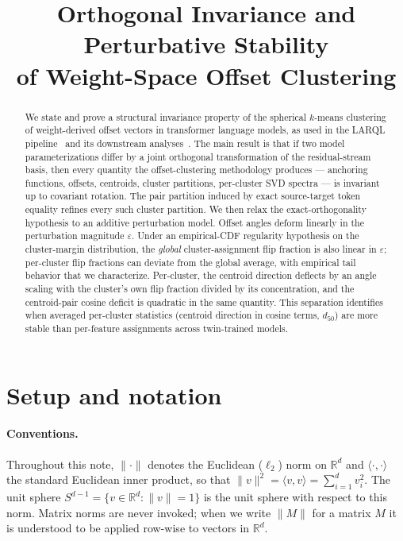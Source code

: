 \documentclass[11pt,letterpaper]{article}
\title{Orthogonal Invariance and Perturbative Stability\\
of Weight-Space Offset Clustering}
\author{}
\date{}
\theoremstyle{definition}
\begin{document}
\maketitle

\begin{abstract}
\noindent We state and prove a structural invariance property of the spherical $k$-means clustering of weight-derived offset vectors in transformer language models, as used in the LARQL pipeline~\citep{hayuk_larql} and its downstream analyses~\citep{cluster_size_confound}. The main result is that if two model parameterizations differ by a joint orthogonal transformation of the residual-stream basis, then every quantity the offset-clustering methodology produces --- anchoring functions, offsets, centroids, cluster partitions, per-cluster SVD spectra --- is invariant up to covariant rotation. The pair partition induced by exact source-target token equality refines every such cluster partition. We then relax the exact-orthogonality hypothesis to an additive perturbation model. Offset angles deform linearly in the perturbation magnitude $\varepsilon$. Under an empirical-CDF regularity hypothesis on the cluster-margin distribution, the \emph{global} cluster-assignment flip fraction is also linear in $\varepsilon$; per-cluster flip fractions can deviate from the global average, with empirical tail behavior that we characterize. Per-cluster, the centroid direction deflects by an angle scaling with the cluster's own flip fraction divided by its concentration, and the centroid-pair cosine deficit is quadratic in the same quantity. This separation identifies when averaged per-cluster statistics (centroid direction in cosine terms, $d_{50}$) are more stable than per-feature assignments across twin-trained models.
\end{abstract}

\section{Setup and notation}

\paragraph{Conventions.} Throughout this note, $\|\cdot\|$ denotes the Euclidean ($\ell_2$) norm on $\mathbb{R}^d$ and $\langle \cdot, \cdot \rangle$ the standard Euclidean inner product, so that $\|v\|^2 = \langle v, v \rangle = \sum_{i=1}^d v_i^2$. The unit sphere $S^{d-1} = \{ v \in \mathbb{R}^d : \|v\| = 1 \}$ is the unit sphere with respect to this norm. Matrix norms are never invoked; when we write $\|M\|$ for a matrix $M$ it is understood to be applied row-wise to vectors in $\mathbb{R}^d$.
\end{document}
